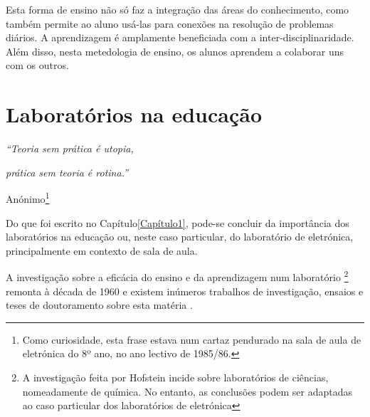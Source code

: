 


Esta forma de ensino não só faz a integração das áreas do conhecimento, como também permite ao aluno usá-las para conexões na resolução de problemas diários. A aprendizagem é amplamente beneficiada com a inter-disciplinaridade. Além disso, nesta metedologia de ensino, os alunos aprendem a colaborar uns com os outros.


\section{Laboratórios na educação}
\label{Laboratóriosnaeducação}

\begin{center}
    \textit{``Teoria sem prática é utopia,}

    \textit{prática sem teoria é rotina.''}

    Anónimo\footnote{Como curiosidade, esta frase estava num cartaz pendurado na sala de aula de eletrónica do 8º ano, no ano lectivo de 1985/86.}
\end{center}

Do que foi escrito no Capítulo\ref{Capítulo1}, pode-se concluir da importância dos laboratórios na educação ou, neste caso particular, do laboratório de eletrónica, principalmente em contexto de sala de aula.

A investigação sobre a eficácia do ensino e da aprendizagem num laboratório \footnote{A investigação feita por Hofstein \cite{Hofstein} incide sobre laboratórios de ciências, nomeadamente de química. No entanto, as conclusões podem ser adaptadas ao caso particular dos laboratórios de eletrónica} remonta à década de 1960 e existem inúmeros trabalhos de investigação, ensaios e teses de doutoramento sobre esta matéria \cite{Hofstein}.

